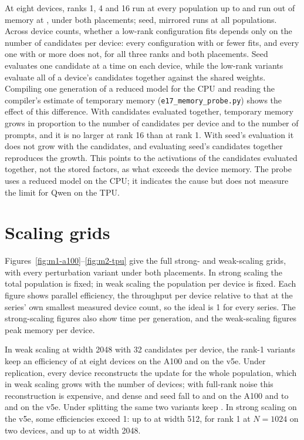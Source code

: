 At eight devices, ranks 1, 4 and 16 run at every population up to \QwenLowFitMaxN{} and run
out of memory at \QwenLowOOMN{}, under both placements; seed, mirrored runs at all
\QwenPopulationCount{} populations. Across device counts, whether a low-rank configuration
fits depends only on the number of candidates per device: every configuration with
\QwenFitPerDevice{} or fewer fits, and every one with \QwenOOMPerDevice{} or more does not,
for all three ranks and both placements. Seed evaluates one candidate at a time on each
device, while the low-rank variants evaluate all of a device's candidates together against
the shared weights. Compiling one generation of a reduced model for the CPU and reading the
compiler's estimate of temporary memory (\texttt{e17\_memory\_probe.py}) shows the effect of
this difference. With candidates evaluated together, temporary memory grows in proportion to
the number of candidates per device and to the number of prompts, and it is no larger at
rank 16 than at rank 1. With seed's evaluation it does not grow with the candidates, and
evaluating seed's candidates together reproduces the growth. This points to the activations
of the candidates evaluated together, not the stored factors, as what exceeds the device
memory. The probe uses a reduced model on the CPU; it indicates the cause but does not
measure the limit for Qwen on the TPU.

\section{Scaling grids}
\label{sec:grids}

Figures~\ref{fig:m1-a100}--\ref{fig:m2-tpu} give the full strong- and weak-scaling grids,
with every perturbation variant under both placements. In strong scaling the total population
is fixed; in weak scaling the population per device is fixed. Each figure shows parallel
efficiency, the throughput per device relative to that at the series' own smallest measured
device count, so the ideal is 1 for every series. The strong-scaling figures also show time
per generation, and the weak-scaling figures peak memory per device.

In weak scaling at width 2048 with 32 candidates per device, the rank-1 variants keep an
efficiency of \ScalingRankOneGPU{} at eight devices on the A100 and \ScalingRankOneTPU{} on
the v5e. Under replication, every device reconstructs the update for the whole population,
which in weak scaling grows with the number of devices; with full-rank noise this
reconstruction is expensive, and dense and seed fall to \ScalingReplDenseGPU{} and
\ScalingReplSeedGPU{} on the A100 and to \ScalingReplDenseTPU{} and \ScalingReplSeedTPU{} on
the v5e. Under splitting the same two variants keep \ScalingSplitFull. In strong scaling on
the v5e, some efficiencies exceed 1: up to \ScalingStrongMax{} at width 512, for rank 1 at
$N=1024$ on two devices, and up to \ScalingStrongMaxWide{} at width 2048.

